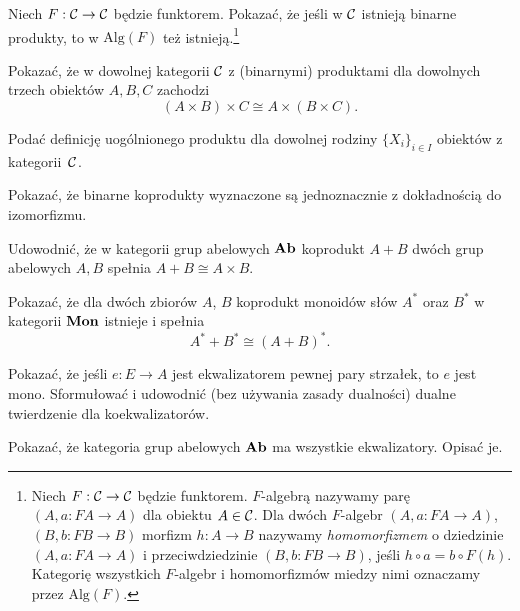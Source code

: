 \begin{zadanie}
    Niech $F:\mathcal{C}\to\mathcal{C}$ będzie funktorem. Pokazać, że jeśli w $\mathcal{C}$ istnieją binarne produkty, to w $\mathrm{Alg}(F)$ też istnieją.\footnote{Niech $F:\mathcal{C}\to \mathcal{C}$ będzie funktorem. $F$-algebrą nazywamy parę $(A,a:FA\to A)$ dla obiektu $A\in \mathcal{C}$. Dla dwóch $F$-algebr $(A,a:FA\to A)$, $(B,b:FB\to B)$ morfizm $h:A\to B$ nazywamy \emph{homomorfizmem} o dziedzinie $(A,a:FA\to A)$ i przeciwdziedzinie $(B,b:FB\to B)$, jeśli $h\circ a = b\circ F(h)$.  Kategorię wszystkich $F$-algebr i homomorfizmów miedzy nimi oznaczamy przez $\mathrm{Alg}(F).$} 
\end{zadanie}

\begin{zadanie}
Pokazać, że w dowolnej kategorii $\mathcal{C}$ z (binarnymi) produktami dla dowolnych trzech obiektów $A,B,C$ zachodzi
$$
(A\times B)\times C \cong A\times (B\times C).
$$
\end{zadanie}

\begin{zadanie}
Podać definicję uogólnionego produktu dla dowolnej rodziny $\{X_i\}_{i\in I}$ obiektów z kategorii~$\mathcal{C}$. 
\end{zadanie}

\begin{zadanie}
Pokazać, że binarne koprodukty wyznaczone są jednoznacznie z dokładnością do izomorfizmu.
\end{zadanie}

\begin{zadanie}\label{zad:ab-koprodukt}
Udowodnić, że w kategorii grup abelowych $\mathbf{Ab}$ koprodukt $A+B$ dwóch grup abelowych $A,B$ spełnia $A+B \cong A\times B$.  
\end{zadanie}

\begin{zadanie}\label{zad:koprodukt-mon}
Pokazać, że dla dwóch zbiorów $A$, $B$ koprodukt monoidów słów $A^\ast$ oraz $B^\ast$ w kategorii $\mathbf{Mon}$ istnieje i spełnia 
$$
A^\ast + B^\ast \cong (A+B)^\ast.
$$
\end{zadanie}

\begin{zadanie}
Pokazać, że jeśli $e:E\to A$ jest ekwalizatorem pewnej pary strzałek, to $e$ jest mono. Sformułować i udowodnić (bez używania zasady dualności) dualne twierdzenie dla koekwalizatorów. 
\end{zadanie}

\begin{zadanie}
Pokazać, że kategoria grup abelowych $\mathbf{Ab}$ ma wszystkie ekwalizatory. Opisać je. 
\end{zadanie}

